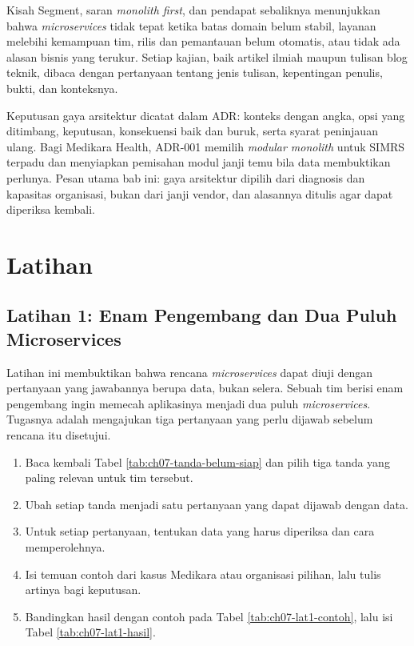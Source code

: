 Kisah Segment, saran \textit{monolith first}, dan pendapat sebaliknya menunjukkan bahwa
\textit{microservices} tidak tepat ketika batas domain belum stabil, layanan melebihi kemampuan
tim, rilis dan pemantauan belum otomatis, atau tidak ada alasan bisnis yang terukur. Setiap kajian,
baik artikel ilmiah maupun tulisan blog teknik, dibaca dengan pertanyaan tentang jenis tulisan,
kepentingan penulis, bukti, dan konteksnya.

Keputusan gaya arsitektur dicatat dalam ADR: konteks dengan angka, opsi yang ditimbang, keputusan,
konsekuensi baik dan buruk, serta syarat peninjauan ulang. Bagi Medikara Health, ADR-001 memilih
\textit{modular monolith} untuk SIMRS terpadu dan menyiapkan pemisahan modul janji temu bila data
membuktikan perlunya. Pesan utama bab ini: gaya arsitektur dipilih dari diagnosis dan kapasitas
organisasi, bukan dari janji vendor, dan alasannya ditulis agar dapat diperiksa kembali.

\section{Latihan}

\subsection*{Latihan 1: Enam Pengembang dan Dua Puluh Microservices}

Latihan ini membuktikan bahwa rencana \textit{microservices} dapat diuji dengan pertanyaan yang
jawabannya berupa data, bukan selera. Sebuah tim berisi enam pengembang ingin memecah aplikasinya
menjadi dua puluh \textit{microservices}. Tugasnya adalah mengajukan tiga pertanyaan yang perlu
dijawab sebelum rencana itu disetujui.

\begin{enumerate}
  \item Baca kembali Tabel \ref{tab:ch07-tanda-belum-siap} dan pilih tiga tanda yang paling relevan
        untuk tim tersebut.
  \item Ubah setiap tanda menjadi satu pertanyaan yang dapat dijawab dengan data.
  \item Untuk setiap pertanyaan, tentukan data yang harus diperiksa dan cara memperolehnya.
  \item Isi temuan contoh dari kasus Medikara atau organisasi pilihan, lalu tulis artinya bagi
        keputusan.
  \item Bandingkan hasil dengan contoh pada Tabel \ref{tab:ch07-lat1-contoh}, lalu isi Tabel
        \ref{tab:ch07-lat1-hasil}.
\end{enumerate}


